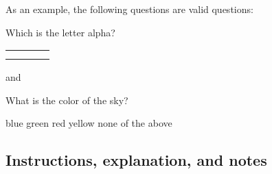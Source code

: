\documentclass{article}
\begin{document}
As an example, the following questions are valid questions:
\begin{code}
\question Which is the letter alpha?
          \begin{mcanswers}
          \begin{tabular}{cccc}
          \answer[correct]{1}{\Huge$\alpha$} & 
          \answer{2}{\Huge$\beta$}  & 
          \answer{3}{\Huge$\gamma$} & 
          \answer{4}{\Huge$\delta$} \\[0.1\baselineskip]
          \answernum{1}&
          \answernum{2}&
          \answernum{3}&
          \answernum{4}\\
          \end{tabular} 
          \end{mcanswers}
\end{code}
and 
\begin{code}
\question What is the color of the sky?
  \begin{mcanswerslist}[fixlast]
  \answer[4] blue
  \answer[-2] green
  \answer[1.5] red
  \answer[1] yellow
  \answer none of the above
  \end{mcanswerslist}  
\end{code}










\subsection{Instructions, explanation, and notes}
\end{document}
